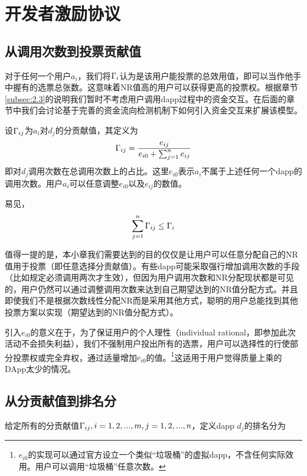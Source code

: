 \section{开发者激励协议}
\subsection{从调用次数到投票贡献值}
对于任何一个用户$a_i$，我们将$\Gamma_i$认为是该用户能投票的总效用值，即可以当作他手中握有的选票总张数。这意味着NR值高的用户可以获得更高的投票权。根据章节\ref{subsec:2.3}的说明我们暂时不考虑用户调用dapp过程中的资金交互。在后面的章节中我们会讨论基于完善的资金流向检测机制下如何引入资金交互来扩展该模型。

设$\Gamma_{ij}$为$a_i$对$d_j$的分贡献值，其定义为
$$  \Gamma_{ij} = \frac{e_{ij}}{e_{i0}+\sum_{j=1}^n {e_{ij}}}$$
即对$d_j$调用次数在总调用次数上的占比。这里$e_{i0}$表示$a_i$不属于上述任何一个dapp的调用次数。用户$a_i$可以任意调整$e_{i0}$以及$e_{ij}$的数值。

易见，
$$\sum_{j=1}^n \Gamma_{ij} \leq \Gamma_i$$

值得一提的是，本小章我们需要达到的目的仅仅是让用户可以任意分配自己的NR值用于投票（即任意选择分贡献值）。有些dapp可能采取强行增加调用次数的手段（比如规定必须调用两次才生效），但因为用户调用次数和NR分配现状都是可见的，用户仍然可以通过调整调用次数来达到自己期望达到的NR值分配方式。并且即使我们不是根据次数线性分配NR而是采用其他方式，聪明的用户总能找到其他投票方案以实现（期望达到的NR值分配方式）。

引入$e_{i0}$的意义在于，为了保证用户的个人理性（individual rational，即参加此次活动不会损失利益），我们不强制用户投出所有的选票，用户可以选择性的行使部分投票权或完全弃权，通过适量增加$e_{i0}$的值。\footnote{$e_{i0}$的实现可以通过官方设立一个类似“垃圾桶”的虚拟dapp，不含任何实际效用。用户可以调用“垃圾桶”任意次数。}这适用于用户觉得质量上乘的DApp太少的情况。


\subsection{从分贡献值到排名分}
给定所有的分贡献值$\Gamma_{ij}, i=1,2,...,m,j=1,2,...,n$，定义dapp $d_j$的排名分为

